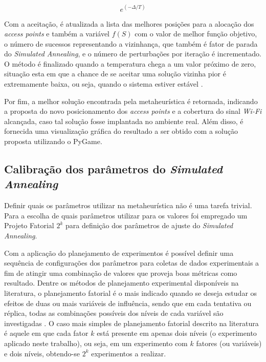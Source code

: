 \documentclass[
	12pt,				%
	twoside,			%
	a4paper,			%
	english,			%
	french,				%
	spanish,			%
	brazil				%
	]{abntex2}
\begin{document}
\begin{equation}
    e^{(-\Delta/T)}
\end{equation}

Com a aceitação, é atualizada a lista das melhores posições para a
alocação dos \emph{access points} e também a variável \(f(S)\) com o
valor de melhor função objetivo, o número de sucessos representando a
vizinhança, que também é fator de parada do \emph{Simulated Annealing},
e o número de perturbações por iteração é incrementado. O método é
finalizado quando a temperatura chega a um valor próximo de zero,
situação esta em que a chance de se aceitar uma solução vizinha pior é
extremamente baixa, ou seja, quando o sistema estiver estável
\cite{VAN}.

Por fim, a melhor solução encontrada pela metaheurística é retornada,
indicando a proposta do novo posicionamento dos \emph{access points} e a
cobertura do sinal \emph{Wi-Fi} alcançada, caso tal solução fosse
implantada no ambiente real. Além disso, é fornecida uma visualização
gráfica do resultado a ser obtido com a solução proposta utilizando o
PyGame.

\subsection{\texorpdfstring{Calibração dos parâmetros do \emph{Simulated
Annealing}}{Calibração dos parâmetros do Simulated Annealing}}\label{calibrauxe7uxe3o-dos-paruxe2metros-do-simulated-annealing}

Definir quais os parâmetros utilizar na metaheurística não é uma tarefa
trivial. Para a escolha de quais parâmetros utilizar para os valores foi
empregado um Projeto Fatorial \(2^{k}\) para definição dos parâmetros de
ajuste do \emph{Simulated Annealing}.

Com a aplicação do planejamento de experimentos é possível definir uma
sequência de configurações dos parâmetros para coletas de dados
experimentais a fim de atingir uma combinação de valores que proveja
boas métricas como resultado. Dentre os métodos de planejamento
experimental disponíveis na literatura, o planejamento fatorial é o mais
indicado quando se deseja estudar os efeitos de duas ou mais variáveis
de influência, sendo que em cada tentativa ou réplica, todas as
combinações possíveis dos níveis de cada variável são investigadas
\cite{NETO}. O caso mais simples de planejamento fatorial descrito na
literatura é aquele em que cada fator \(k\) está presente em apenas dois
níveis (o experimento aplicado neste trabalho), ou seja, em um
experimento com \(k\) fatores (ou variáveis) e dois níveis, obtendo-se
\(2^{k}\) experimentos a realizar.
\end{document}
